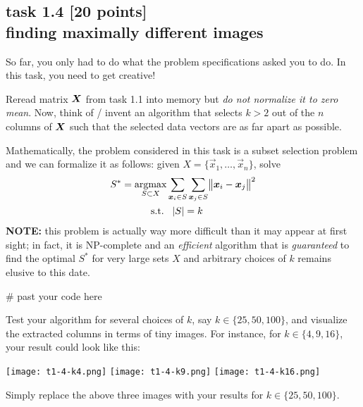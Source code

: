 
\subsection*{task 1.4 [20 points] \\[1ex] finding maximally different images}

So far, you only had to do what the problem specifications asked you to do. In this task, you need to get creative!

Reread matrix $\bm{X}$ from task 1.1 into memory but \emph{do not normalize it to zero mean}. Now, think of / invent an algorithm that selects $k>2$ out of the $n$ columns of $\bm{X}$ such that the selected data vectors are as far apart as possible. 

Mathematically, the problem considered in this task is a subset selection problem and we can formalize it as follows: given $X = \{ \vec{x}_1, \ldots, \vec{x}_n \}$, solve
\begin{align*}
S^* = \operatorname*{argmax}_{S \subset X} & \sum_{\bm{x}_i \in S} \sum_{\bm{x}_j \in S} \bigl \lVert \bm{x}_i - \bm{x}_j \bigr \rVert^2 \\
\operatorname{s.\!t.} \; & \; \; \lvert S \rvert = k
\end{align*}
\textbf{NOTE:} this problem is actually way more difficult than it may appear at first sight; in fact, it is NP-complete and an \textit{efficient} algorithm that is \textit{guaranteed} to find the optimal $S^*$ for very large sets $X$ and arbitrary choices of $k$ remains elusive to this date. \vspace{1ex}

\begin{python}
# past your code here


\end{python}
\vspace{2cm}

Test your algorithm for several choices of $k$, say $k \in \{ 25, 50, 100 \}$, and visualize the extracted columns in terms of tiny images. For instance, for $k \in \{ 4, 9, 16 \}$, your result could look like this:
\begin{center}
\texttt{[image: t1-4-k4.png]} 
\quad
\texttt{[image: t1-4-k9.png]}
\quad
\texttt{[image: t1-4-k16.png]}
\end{center}
Simply replace the above three images with your results for $k \in \{25, 50, 100\}$.






